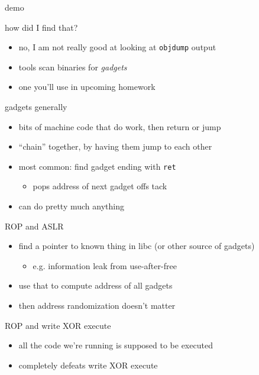 
\begin{frame}{demo}
\end{frame}

\begin{frame}{how did I find that?}
    \begin{itemize}
        \item no, I am not really good at looking at \texttt{objdump} output
        \item tools scan binaries for \textit{gadgets}
        \item one you'll use in upcoming homework
    \end{itemize}
\end{frame}

\begin{frame}{gadgets generally}
    \begin{itemize}
        \item bits of machine code that do work, then return or jump
        \item ``chain'' together, by having them jump to each other
        \item most common: find gadget ending with \texttt{ret}
            \begin{itemize}
            \item pops address of next gadget offs tack
            \end{itemize}
        \item can do pretty much anything
    \end{itemize}
\end{frame}

\begin{frame}{ROP and ASLR}
    \begin{itemize}
    \item find a pointer to known thing in libc (or other source of gadgets)
        \begin{itemize}
        \item e.g. information leak from use-after-free
        \end{itemize}
    \item use that to compute address of all gadgets
    \item then address randomization doesn't matter
    \end{itemize}
\end{frame}

\begin{frame}{ROP and write XOR execute}
    \begin{itemize}
    \item all the code we're running is supposed to be executed
    \item completely defeats write XOR execute
    \end{itemize}
\end{frame}

